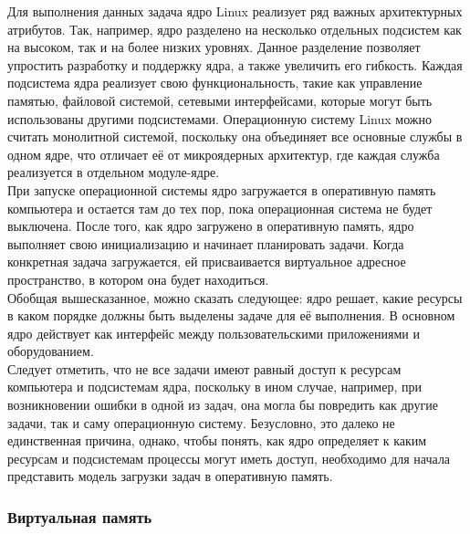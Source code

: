 Для выполнения данных задача ядро Linux реализует ряд важных архитектурных атрибутов.
Так, например, ядро разделено на несколько отдельных подсистем как на высоком, так и на более низких уровнях.
Данное разделение позволяет упростить разработку и поддержку ядра, а также увеличить его гибкость.
Каждая подсистема ядра реализует свою функциональность, такие как управление памятью, файловой системой, сетевыми интерфейсами, которые могут быть использованы другими подсистемами.
Операционную систему Linux можно считать монолитной системой, поскольку она объединяет все основные службы в одном ядре, что отличает её от микроядерных архитектур, где каждая служба реализуется в отдельном модуле-ядре.\\
При запуске операционной системы ядро загружается в оперативную память компьютера и остается там до тех пор, пока операционная система не будет выключена.
После того, как ядро загружено в оперативную память, ядро выполняет свою инициализацию и начинает планировать задачи.
Когда конкретная задача загружается, ей присваивается виртуальное адресное пространство, в котором она будет находиться.\vspace{0.5cm}\\
\indent Обобщая вышесказанное, можно сказать следующее: ядро решает, какие ресурсы в каком порядке должны быть выделены задаче для её выполнения.
В основном ядро действует как интерфейс между пользовательскими приложениями и оборудованием.\\
Следует отметить, что не все задачи имеют равный доступ к ресурсам компьютера и подсистемам ядра, поскольку в ином случае, например, при возникновении ошибки в одной из задач, она могла бы повредить как другие задачи, так и саму операционную систему.
Безусловно, это далеко не единственная причина, однако, чтобы понять, как ядро определяет к каким ресурсам и подсистемам процессы могут иметь доступ, необходимо для начала представить модель загрузки задач в оперативную память.

\subsubsection{Виртуальная память}\label{subsec:-}

